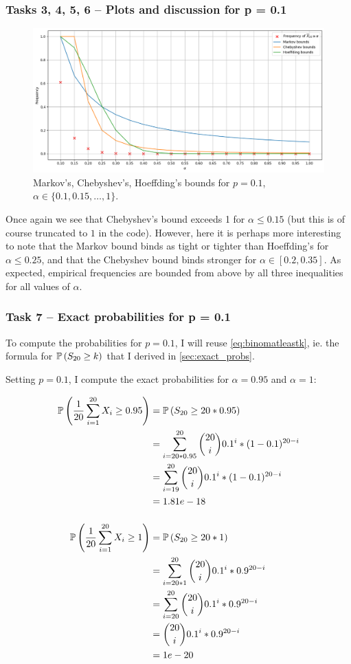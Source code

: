 \subsubsection{Tasks 3, 4, 5, 6 -- Plots and discussion for p = 0.1}

\begin{figure}[H]
  \includegraphics[width=\textwidth]{figures/task_1_b.png}
  \caption{\footnotesize Markov's, Chebyshev's, Hoeffding's bounds for $p =
  0.1$, $\alpha \in \{0.1, 0.15, \dots, 1\}$.}
  \label{fig:task_1_b}
\end{figure}

Once again we see that Chebyshev's bound exceeds 1 for $\alpha \leq 0.15$ (but
this is of course truncated to $1$ in the code). However, here it is perhaps
more interesting to note that the Markov bound binds as tight or tighter than
Hoeffding's for $\alpha \leq 0.25$, and that the Chebyshev bound binds stronger
for $\alpha \in [0.2, 0.35]$. As expected, empirical frequencies are bounded
from above by all three inequalities for all values of $\alpha$.

\subsubsection{Task 7 -- Exact probabilities for p = 0.1}

To compute the probabilities for $p = 0.1$, I will reuse
\cref{eq:binomatleastk}, ie. the formula for $\mathbb P \left(S_{20} \geq k\right)$ that I derived
in \cref{sec:exact_probs}.

Setting $p = 0.1$, I compute the exact probabilities for $\alpha = 0.95$ and
$\alpha = 1$:

\begin{align*}
  \PP{\frac{1}{20}\sum_{i = 1}^{20} X_i \geq 0.95} &= \PP{S_{20} \geq
  20 * 0.95}\\
  &= \sum_{i = 20 * 0.95}^{20} \binom{20}{i} 0.1^i * (1 - 0.1)^{20 - i}\\
  &= \sum_{i = 19}^{20} \binom{20}{i} 0.1^i * (1 - 0.1)^{20 - i}\\
  &= 1.81e-18\\[12pt]
%
  \PP{\frac{1}{20}\sum_{i = 1}^{20} X_i \geq 1} &= \PP{S_{20} \geq
  20 * 1}\\
  &= \sum_{i = 20 * 1}^{20} \binom{20}{i} 0.1^i * 0.9^{20 - i}\\
  &= \sum_{i = 20}^{20} \binom{20}{i} 0.1^i * 0.9^{20 - i}\\
  &= \binom{20}{i} 0.1^i * 0.9^{20 - i}\\
  &= 1e-20
\end{align*}



\sectend
